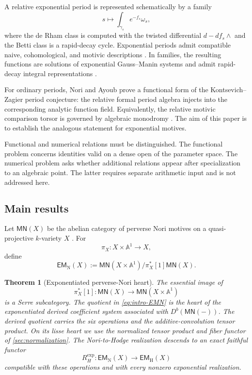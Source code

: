 \documentclass[11pt]{article}
\numberwithin{equation}{section}
\newtheorem{theorem}{Theorem}[section]
\theoremstyle{definition}
\theoremstyle{remark}
\newcommand{\MN}{\mathsf{MN}}
\newcommand{\Aone}{\mathbb A^1}
\newcommand{\EMN}{\mathsf{EM}_{\mathrm N}}
\newcommand{\EMH}{\mathsf{EM}_{\mathrm H}}
\begin{document}
A relative exponential period is represented schematically by a family
\[
  s\longmapsto \int_{\gamma_s} e^{-f_s}\omega_s,
\]
where the de Rham class is computed with the twisted differential
$d-df_s\wedge$ and the Betti class is a rapid-decay cycle.  Exponential periods admit compatible naive, cohomological, and motivic
descriptions \cite{CHH,FresanJossenExp}.  In families, the resulting functions
are solutions of exponential Gauss--Manin systems and admit rapid-decay integral
representations \cite{HienRoucairol,Hien}.

For ordinary periods, Nori and Ayoub prove a functional form of the
Kontsevich--Zagier period conjecture: the relative formal period algebra injects
into the corresponding analytic function field.  Equivalently, the relative
motivic comparison torsor is governed by algebraic monodromy
\cite{KontsevichZagier,AyoubPeriods,AyoubRelative,Mostaed,BakkerTsimerman}.
The aim of this paper is to establish the analogous statement for exponential
motives.

Functional and numerical relations must be distinguished.  The functional
problem concerns identities valid on a dense open of the parameter space.  The
numerical problem asks whether additional relations appear after specialization
to an algebraic point.  The latter requires separate arithmetic input and is not
addressed here.

\subsection{Main results}

Let $\MN(X)$ be the abelian category of perverse Nori motives on a
quasi-projective $k$-variety $X$ \cite{IvorraMorel,Terenzi,Tubach}.  For
\[
  \pi_X:X\times\Aone\longrightarrow X,
\]
define
\begin{equation}\label{eq:intro-EMN}
  \EMN(X)
  :=\MN(X\times\Aone)\big/\pi_X^*[1]\MN(X).
\end{equation}

\begin{theorem}[Exponentiated perverse-Nori heart]\label{thm:intro-heart}
The essential image of
\[
  \pi_X^*[1]:\MN(X)\longrightarrow\MN(X\times\Aone)
\]
is a Serre subcategory.  The quotient in \eqref{eq:intro-EMN} is the heart of
the exponentiated derived coefficient system associated with $D^b(\MN(-))$.
The derived quotient carries the six operations and the additive-convolution
tensor product. On its lisse heart we use the normalized tensor product
and fiber functor of \cref{sec:normalization}.  The
Nori-to-Hodge realization descends to an exact faithful functor
\[
  R_H^{\exp}:\EMN(X)\longrightarrow\EMH(X)
\]
compatible with these operations and with every nonzero exponential
realization.
\end{theorem}
\end{document}
